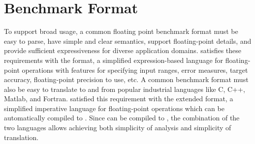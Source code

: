 \documentclass[main.tex]{subfiles}
\begin{document}
\section{Benchmark Format}
\label{sec:format}

To support broad usage,
  a common floating point benchmark format must be
  easy to parse,
  have simple and clear semantics,
  support floating-point details, and
  provide sufficient expressiveness for diverse application domains.
\name satisfies these requirements
  with the \core format,
  a simplified expression-based language
  for floating-point operations
  with features for specifying input ranges,
  error measures, target accuracy, floating-point
  precision to use, etc.
A common benchmark format
  must also be easy to translate to and from
  popular industrial languages like C, C++, Matlab, and Fortran.
\name satisfied this requirement with
  the extended \surface format,
  a simplified imperative language for floating-point operations
  which can be automatically compiled to \core.
Since \surface can be compiled to \core,
  the combination of the two languages
  allows achieving both simplicity of analysis
  and simplicity of translation.



\subsection{\core}
\end{document}
